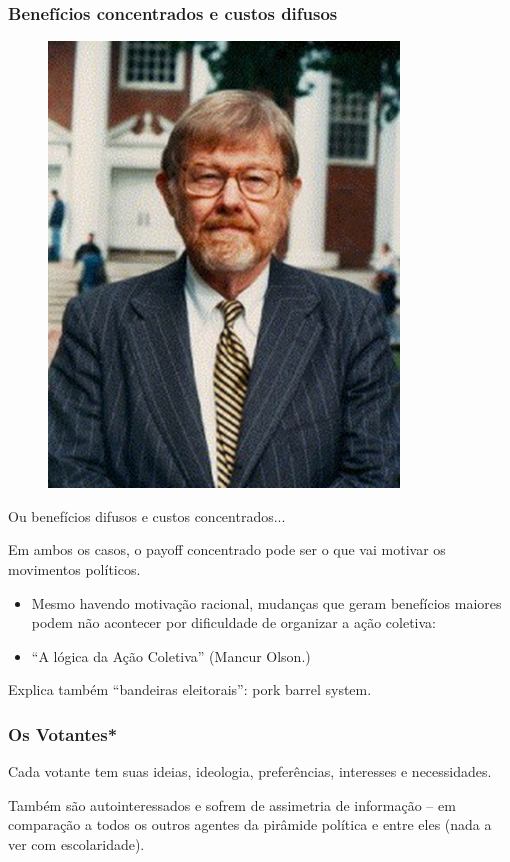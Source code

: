 \documentclass[a4paper,12pt]{article}[abntex2]
\begin{document}
\subsubsection{\textbf{Benefícios concentrados e custos difusos}}
\begin{figure}[H]
    \centering
    \includegraphics[width=0.7\linewidth]{Imagens/a15i6.png}
\end{figure}

Ou benefícios difusos e custos concentrados...

Em ambos os casos, o  payoff concentrado pode ser o que vai motivar os movimentos políticos. \begin{itemize}
    \item Mesmo havendo motivação racional, mudanças que geram benefícios maiores podem não acontecer por dificuldade de organizar a ação coletiva:
    \item “A lógica da Ação Coletiva” (Mancur Olson.)
\end{itemize}

Explica também “bandeiras eleitorais”: pork barrel system.

\subsubsection{\textbf{Os Votantes*}}
Cada votante tem suas ideias, ideologia, preferências, interesses e necessidades. 

Também são autointeressados e sofrem de assimetria de informação – em comparação a todos os outros agentes da pirâmide política e entre eles (nada a ver com escolaridade). 
\end{document}
